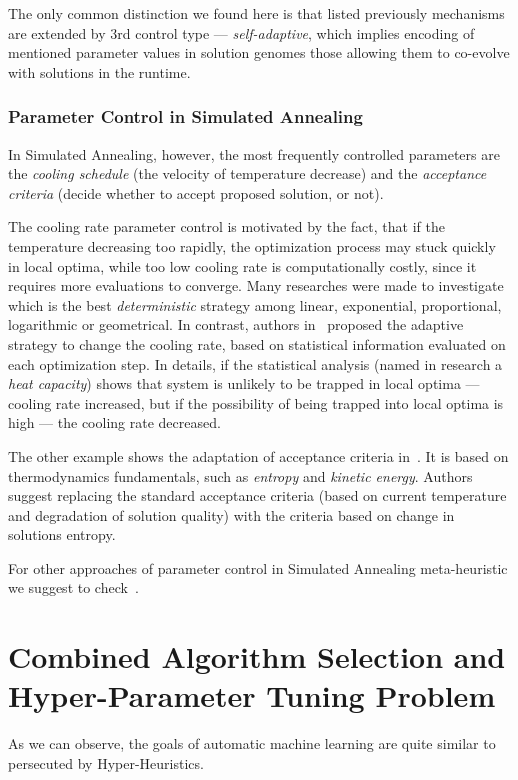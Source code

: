 The only common distinction we found here is that listed previously mechanisms are extended by 3rd control type — \textit{self-adaptive}, which implies encoding of mentioned parameter values in solution genomes those allowing them to co-evolve with solutions in the runtime.

\subsubsection{Parameter Control in Simulated Annealing}\label{bg: parameter control: SA}
In Simulated Annealing, however, the most frequently controlled parameters are the \textit{cooling schedule} (the velocity of temperature decrease) and the \textit{acceptance criteria} (decide whether to accept proposed solution, or not).

The cooling rate parameter control is motivated by the fact, that if the temperature decreasing too rapidly, the optimization process may stuck quickly in local optima, while too low cooling rate is computationally costly, since it requires more evaluations to converge. Many researches were made to investigate which is the best \textit{deterministic} strategy among linear, exponential, proportional, logarithmic or geometrical. In contrast, authors in~\cite{karabin2020simulated} proposed the adaptive strategy to change the cooling rate, based on statistical information evaluated on each optimization step. In details, if the statistical analysis (named in research a \textit{heat capacity}) shows that system is unlikely to be trapped in local optima — cooling rate increased, but if the possibility of being trapped into local optima is high — the cooling rate decreased.

The other example shows the adaptation of acceptance criteria in~\cite{ghandeshtani2019entropy}. It is based on thermodynamics fundamentals, such as \textit{entropy} and \textit{kinetic energy}. Authors suggest replacing the standard acceptance criteria (based on current temperature and degradation of solution quality) with the criteria based on change in solutions entropy.

For other approaches of parameter control in Simulated Annealing meta-heuristic we suggest to check~\cite{ingber2000adaptive,de2003placement}.


\section{Combined Algorithm Selection and Hyper-Parameter Tuning Problem} 
As we can observe, the goals of automatic machine learning are quite similar to persecuted by Hyper-Heuristics.

